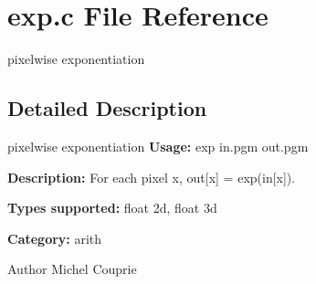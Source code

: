 \section{exp.c File Reference}
\label{exp_8c}


pixelwise exponentiation  




\subsection{Detailed Description}
pixelwise exponentiation {\bfseries Usage:} exp in.pgm out.pgm

{\bfseries Description:} For each pixel x, out[x] = exp(in[x]).

{\bfseries Types supported:} float 2d, float 3d

{\bfseries Category:} arith

\begin{DoxyAuthor}{Author}
Michel Couprie 
\end{DoxyAuthor}

